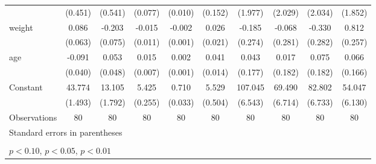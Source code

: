 \begin{table}[htbp]
\begin{tabular}{l*{9}{c}}
                    &     (0.451)         &     (0.541)         &     (0.077)         &     (0.010)         &     (0.152)         &     (1.977)         &     (2.029)         &     (2.034)         &     (1.852)         \\
\addlinespace
weight              &       0.086         &      -0.203\sym{***}&      -0.015         &      -0.002         &       0.026         &      -0.185         &      -0.068         &      -0.330         &       0.812\sym{***}\\
                    &     (0.063)         &     (0.075)         &     (0.011)         &     (0.001)         &     (0.021)         &     (0.274)         &     (0.281)         &     (0.282)         &     (0.257)         \\
\addlinespace
age                 &      -0.091\sym{**} &       0.053         &       0.015\sym{**} &       0.002\sym{**} &       0.041\sym{***}&       0.043         &       0.017         &       0.075         &       0.066         \\
                    &     (0.040)         &     (0.048)         &     (0.007)         &     (0.001)         &     (0.014)         &     (0.177)         &     (0.182)         &     (0.182)         &     (0.166)         \\
\addlinespace
Constant            &      43.774\sym{***}&      13.105\sym{***}&       5.425\sym{***}&       0.710\sym{***}&       5.529\sym{***}&     107.045\sym{***}&      69.490\sym{***}&      82.802\sym{***}&      54.047\sym{***}\\
                    &     (1.493)         &     (1.792)         &     (0.255)         &     (0.033)         &     (0.504)         &     (6.543)         &     (6.714)         &     (6.733)         &     (6.130)         \\
\midrule
Observations        &          80         &          80         &          80         &          80         &          80         &          80         &          80         &          80         &          80         \\
\bottomrule
\multicolumn{10}{l}{\footnotesize Standard errors in parentheses}\\
\multicolumn{10}{l}{\footnotesize  }\\
\multicolumn{10}{l}{\footnotesize \sym{*} \(p<0.10\), \sym{**} \(p<0.05\), \sym{***} \(p<0.01\)}\\
\end{tabular}
\end{table}
